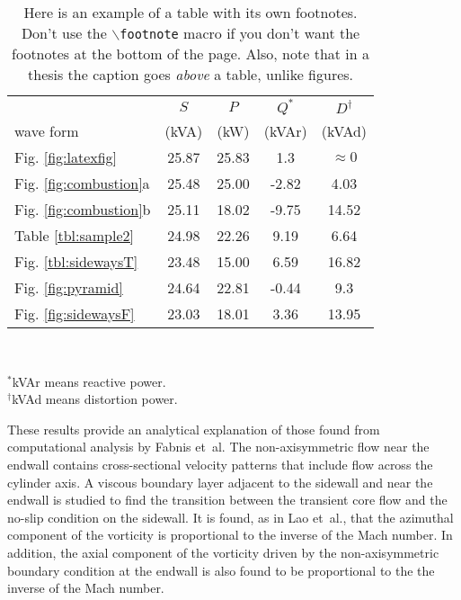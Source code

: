 \begin{table}[htb]
\label{powertable}
\caption[Example of a table with its own footnotes]{
	Here is an example of a table with its own footnotes.
	Don't use the $\backslash${\tt footnote} macro if you
	don't want the footnotes at the bottom of the page.
	Also, note that in a thesis the caption goes
	\emph{above} a table, unlike figures.
	}
\begin{center}
\begin{tabular}{||l|c|c|c|c||} \hline
	& $S$ & $P$ &   $Q^{\ast}$  & $D^{\dagger}$ \\	%
	wave form & (kVA) & (kW) & (kVAr) & (kVAd) \\  \hline \hline
	Fig.  \ref{fig:latexfig} & 25.87 & 25.83 & 1.3 & $\approx 0$ \\ \hline
	Fig.  \ref{fig:combustion}a  & 25.48 & 25.00 & -2.82 & 4.03 \\ \hline
	Fig.  \ref{fig:combustion}b  & 25.11 & 18.02 & -9.75 & 14.52 \\ \hline
	Table \ref{tbl:sample2}  & 24.98 & 22.26 & 9.19 & 6.64 \\ \hline
	Fig.  \ref{tbl:sidewaysT}  & 23.48 & 15.00 & 6.59 & 16.82 \\ \hline
	Fig.  \ref{fig:pyramid}  & 24.64 & 22.81 & -0.44 & 9.3 \\ \hline
	Fig.  \ref{fig:sidewaysF}  & 23.03 & 18.01 & 3.36 & 13.95 \\ \hline
	\end{tabular}
   \\ \rule{0mm}{5mm}
   ${}^\ast$kVAr means reactive power.		%
\\ ${}^\dagger$kVAd means distortion power.	%
\end{center}
\end{table}


These results provide an analytical explanation of those
found from computational analysis by Fabnis
et~al.\cite{fabnis}  The non-axisymmetric flow near the
endwall contains cross-sectional velocity patterns that
include flow across the cylinder axis.  A viscous boundary
layer adjacent to the sidewall and near the endwall is
studied to find the transition between the transient core
flow and the no-slip condition on the sidewall.
It is found, as in Lao et~al.\cite{lao:paper}, that the
azimuthal component of the vorticity is proportional to
the inverse of the Mach number.  In addition, the axial
component of the vorticity driven by the non-axisymmetric
boundary condition at the endwall is also found to be
proportional to the the inverse of the Mach number.


